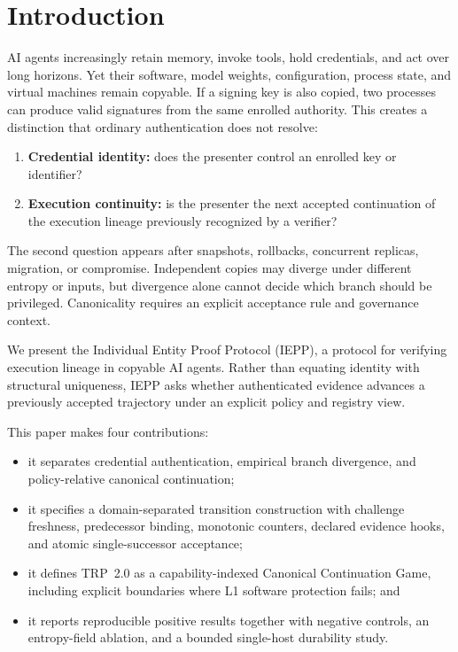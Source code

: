 \documentclass[11pt]{article}
\newcommand{\iepp}{\textsc{IEPP}}
\begin{document}
\section{Introduction}
AI agents increasingly retain memory, invoke tools, hold credentials, and act over long horizons. Yet their software, model weights, configuration, process state, and virtual machines remain copyable. If a signing key is also copied, two processes can produce valid signatures from the same enrolled authority. This creates a distinction that ordinary authentication does not resolve:
\begin{enumerate}
  \item \textbf{Credential identity:} does the presenter control an enrolled key or identifier?
  \item \textbf{Execution continuity:} is the presenter the next accepted continuation of the execution lineage previously recognized by a verifier?
\end{enumerate}

The second question appears after snapshots, rollbacks, concurrent replicas, migration, or compromise. Independent copies may diverge under different entropy or inputs, but divergence alone cannot decide which branch should be privileged. Canonicality requires an explicit acceptance rule and governance context.

We present the Individual Entity Proof Protocol (\iepp), a protocol for verifying execution lineage in copyable AI agents. Rather than equating identity with structural uniqueness, \iepp{} asks whether authenticated evidence advances a previously accepted trajectory under an explicit policy and registry view.

This paper makes four contributions:
\begin{itemize}
  \item it separates credential authentication, empirical branch divergence, and policy-relative canonical continuation;
  \item it specifies a domain-separated transition construction with challenge freshness, predecessor binding, monotonic counters, declared evidence hooks, and atomic single-successor acceptance;
  \item it defines TRP~2.0 as a capability-indexed Canonical Continuation Game, including explicit boundaries where L1 software protection fails; and
  \item it reports reproducible positive results together with negative controls, an entropy-field ablation, and a bounded single-host durability study.
\end{itemize}
\end{document}
